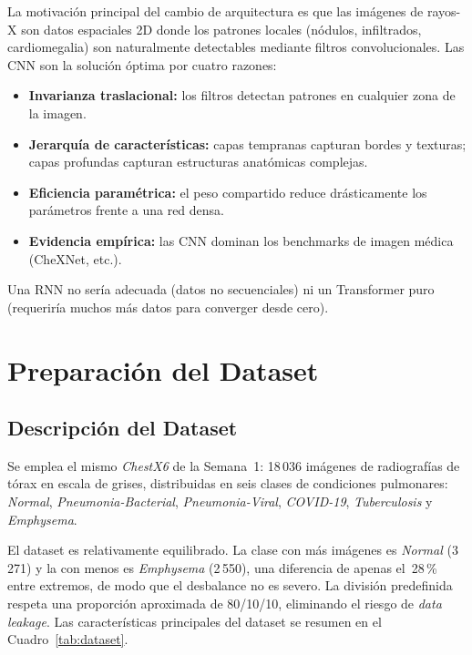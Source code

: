 \documentclass[10pt,twocolumn]{article}
\begin{document}
La motivación principal del cambio de arquitectura es que las imágenes
de rayos-X son datos espaciales 2D donde los patrones locales (nódulos,
infiltrados, cardiomegalia) son naturalmente detectables mediante filtros
convolucionales.  Las CNN son la solución óptima por cuatro razones:
\begin{itemize}[leftmargin=*,noitemsep,topsep=2pt]
  \item \textbf{Invarianza traslacional:} los filtros detectan patrones
        en cualquier zona de la imagen.
  \item \textbf{Jerarquía de características:} capas tempranas capturan
        bordes y texturas; capas profundas capturan estructuras
        anatómicas complejas.
  \item \textbf{Eficiencia paramétrica:} el peso compartido reduce
        drásticamente los parámetros frente a una red densa.
  \item \textbf{Evidencia empírica:} las CNN dominan los benchmarks de
        imagen médica (CheXNet, etc.).
\end{itemize}

Una RNN no sería adecuada (datos no secuenciales) ni un Transformer
puro (requeriría muchos más datos para converger desde cero).

\section{Preparación del Dataset}

\subsection{Descripción del Dataset}

Se emplea el mismo \textit{ChestX6} de la Semana~1: 18\,036 imágenes de
radiografías de tórax en escala de grises, distribuidas en seis clases
de condiciones pulmonares: \textit{Normal}, \textit{Pneumonia-Bacterial},
\textit{Pneumonia-Viral}, \textit{COVID-19}, \textit{Tuberculosis} y
\textit{Emphysema}.

El dataset es relativamente equilibrado.  La clase con más imágenes es
\textit{Normal} (3\,271) y la con menos es \textit{Emphysema} (2\,550),
una diferencia de apenas el~28\,\% entre extremos, de modo que el
desbalance no es severo.  La división predefinida respeta una proporción
aproximada de 80/10/10, eliminando el riesgo de \textit{data leakage}.
Las características principales del dataset se resumen en el
Cuadro~\ref{tab:dataset}.
\end{document}
